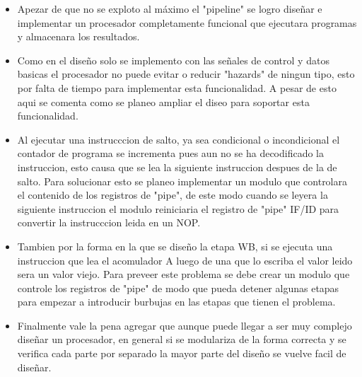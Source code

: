 \documentclass[paper=letter, fontsize=12pt]{article}
\begin{document}
\begin{itemize}
\item Apezar de que no se exploto al máximo el "pipeline" se logro diseñar e implementar un procesador completamente funcional que ejecutara programas y almacenara los resultados.\\


\item Como en el diseño solo se implemento con las señales de control y datos basicas el procesador no puede evitar o reducir "hazards" de ningun tipo, esto por falta de tiempo para implementar esta funcionalidad. A pesar de esto aqui se comenta como se planeo ampliar el diseo para soportar esta funcionalidad.\\

\item Al ejecutar una instrucccion de salto, ya sea condicional o incondicional el contador de programa se incrementa pues aun no se ha decodificado la instruccion, esto causa que se lea la siguiente instruccion despues de la de salto. Para solucionar esto se planeo implementar un modulo que controlara el contenido de los registros de "pipe", de este modo cuando se leyera la siguiente instruccion el modulo reiniciaria el registro de "pipe" IF/ID para convertir la instrucccion leida en un NOP.\\

\item Tambien por la forma en la que se diseño la etapa WB, si se ejecuta una instruccion que lea el acomulador A luego de una que lo escriba el valor leido sera un valor viejo. Para preveer este problema se debe crear un modulo que controle los registros de "pipe" de modo que pueda detener algunas etapas para empezar a introducir burbujas en las etapas que tienen el problema.\\

\item Finalmente vale la pena agregar que aunque puede llegar a ser muy complejo diseñar un procesador, en general si se modulariza de la forma correcta y se verifica cada parte por separado la mayor parte del diseño se vuelve facil de diseñar.
\end{itemize}
\end{document}
